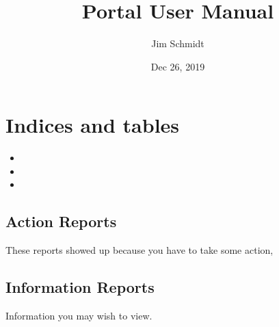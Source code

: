 \documentclass[letterpaper,10pt,english]{sphinxmanual}
\title{Portal User Manual}
\date{Dec 26, 2019}
\author{Jim Schmidt}
\begin{document}
\pagestyle{empty}
\sphinxmaketitle
\pagestyle{plain}
\sphinxtableofcontents
\pagestyle{normal}
\label{\detokenize{index::doc}}


\noindent{}


\chapter{Indices and tables}
\label{\detokenize{index:indices-and-tables}}\begin{itemize}
\item {} 

\item {} 

\item {} 

\end{itemize}


\section{Action Reports}
\label{\detokenize{index:action-reports}}
These reports showed up because you have to take some action,


\section{Information Reports}
\label{\detokenize{index:information-reports}}
Information you may wish to view.
\end{document}
